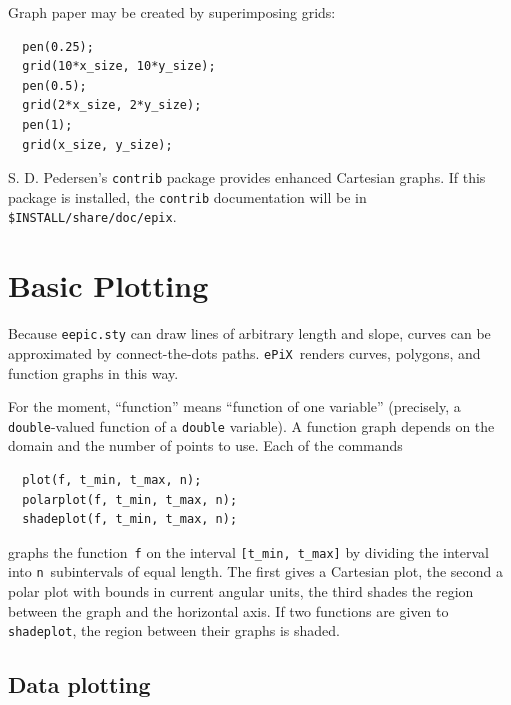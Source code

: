 \documentclass[12pt]{report}
\newcommand{\code}[1]{\texttt{#1}}
\newcommand{\filename}[1]{\texttt{#1}}
\newcommand{\ePiX}{\code{ePiX}}
\begin{document}
Graph paper may be created by superimposing grids:
\begin{center}
  \begin{minipage}[b]{2.5in}
    \begin{footnotesize}
\begin{verbatim}
  pen(0.25);
  grid(10*x_size, 10*y_size);
  pen(0.5);
  grid(2*x_size, 2*y_size);
  pen(1);
  grid(x_size, y_size);
\end{verbatim}
    \end{footnotesize}
  \end{minipage}
  \qquad
  
\end{center}

S. D. Pedersen's \code{contrib} package provides enhanced Cartesian
graphs. If this package is installed, the \code{contrib} documentation
will be in \filename{\$INSTALL/share/doc/epix}.


\section{Basic Plotting}

Because \filename{eepic.sty} can draw lines of arbitrary length and
slope, curves can be approximated by connect-the-dots paths. \ePiX\ 
renders curves, polygons, and function graphs in this way.

For the moment, ``function'' means ``function of one variable''
(precisely, a \code{double}-valued function of a \code{double}
variable). A function graph depends on the domain and the number of
points to use. Each of the commands
\begin{verbatim}
  plot(f, t_min, t_max, n);
  polarplot(f, t_min, t_max, n);
  shadeplot(f, t_min, t_max, n);
\end{verbatim}
graphs the function~\code{f} on the interval \code{[t\_min, t\_max]}
by dividing the interval into \code{n}~subintervals of equal length.
The first gives a Cartesian plot, the second a polar
plot with bounds in current angular units, the
third shades the region between the graph and the horizontal axis. If
two functions are given to \code{shadeplot}, the region between their
graphs is shaded.


\subsection*{Data plotting} 
\end{document}
